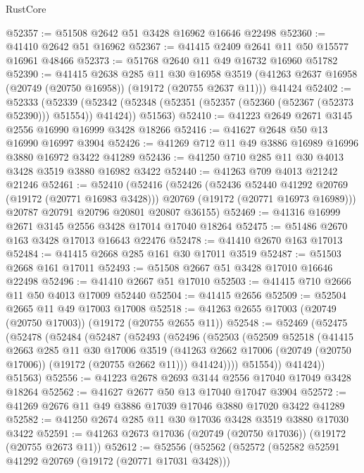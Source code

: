 \begin{lexlean}{RustCore}
\begin{coremodule}
@52357 := @51508 @2642 @51 @3428 @16962 @16646 @22498
@52360 := @41410 @2642 @51 @16962
@52367 := @41415 @2409 @2641 @11 @50 @15577 @16961 @48466
@52373 := @51768 @2640 @11 @49 @16732 @16960 @51782
@52390 := @41415
    @2638
    @285
    @11
    @30
    @16958
    @3519
    (@41263 @2637 @16958 (@20749 (@20750 @16958)) (@19172 (@20755 @2637 @11)))
    @41424
@52402 := @52333
    (@52339
      (@52342 (@52348 (@52351 (@52357 (@52360 (@52367 (@52373 @52390))) @51554)) @41424))
      @51563)
@52410 := @41223 @2649 @2671 @3145 @2556 @16990 @16999 @3428 @18266
@52416 := @41627 @2648 @50 @13 @16990 @16997 @3904
@52426 := @41269 @712 @11 @49 @3886 @16989 @16996 @3880 @16972 @3422 @41289
@52436 := @41250 @710 @285 @11 @30 @4013 @3428 @3519 @3880 @16982 @3422
@52440 := @41263 @709 @4013 @21242 @21246
@52461 := @52410
    (@52416
      (@52426
        (@52436 @52440 @41292 @20769 (@19172 (@20771 @16983 @3428)))
        @20769
        (@19172 (@20771 @16973 @16989)))
      @20787
      @20791
      @20796
      @20801
      @20807
      @36155)
@52469 := @41316 @16999 @2671 @3145 @2556 @3428 @17014 @17040 @18264
@52475 := @51486 @2670 @163 @3428 @17013 @16643 @22476
@52478 := @41410 @2670 @163 @17013
@52484 := @41415 @2668 @285 @161 @30 @17011 @3519
@52487 := @51503 @2668 @161 @17011
@52493 := @51508 @2667 @51 @3428 @17010 @16646 @22498
@52496 := @41410 @2667 @51 @17010
@52503 := @41415 @710 @2666 @11 @50 @4013 @17009 @52440
@52504 := @41415 @2656
@52509 := @52504 @2665 @11 @49 @17003 @17008
@52518 := @41263 @2655 @17003 (@20749 (@20750 @17003)) (@19172 (@20755 @2655 @11))
@52548 := @52469
    (@52475
      (@52478
        (@52484
          (@52487
            (@52493
              (@52496
                (@52503
                  (@52509
                    @52518
                    (@41415
                      @2663
                      @285
                      @11
                      @30
                      @17006
                      @3519
                      (@41263 @2662 @17006 (@20749 (@20750 @17006)) (@19172 (@20755 @2662 @11)))
                      @41424))))
              @51554))
          @41424))
      @51563)
@52556 := @41223 @2678 @2693 @3144 @2556 @17040 @17049 @3428 @18264
@52562 := @41627 @2677 @50 @13 @17040 @17047 @3904
@52572 := @41269 @2676 @11 @49 @3886 @17039 @17046 @3880 @17020 @3422 @41289
@52582 := @41250 @2674 @285 @11 @30 @17036 @3428 @3519 @3880 @17030 @3422
@52591 := @41263 @2673 @17036 (@20749 (@20750 @17036)) (@19172 (@20755 @2673 @11))
@52612 := @52556
    (@52562
      (@52572
        (@52582 @52591 @41292 @20769 (@19172 (@20771 @17031 @3428)))

\end{coremodule}
\end{lexlean}
